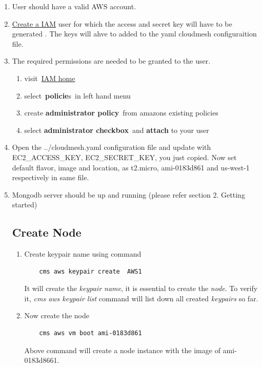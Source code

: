 \documentclass[9pt,twocolumn,twoside]{../../styles/osajnl}
\begin{document}

\begin{enumerate}
	\item User should have a valid AWS account.
	\item \href{https://console.aws.amazon.com/iam/home?#/users}{Create a IAM}  user for which the access and secret key will have to be generated \cite{www-attach-policy}. The keys will ahve to added to the yaml cloudmesh configuraition file.
	
	\item The required permissions are needed to be granted to the user.
		\begin{enumerate}
			
			\item visit \href{https://console.aws.amazon.com/iam/home} {IAM home}
			\item select \textbf{policie}s in left hand menu
			\item create \textbf{administrator policy} from amazons existing policies
			\item select \textbf{administrator checkbox} and \textbf{attach} to your user
		\end{enumerate}
		
	\item Open the ../cloudmesh.yaml configuration file and update with EC2\_ACCESS\_KEY, EC2\_SECRET\_KEY, you just copied. Now set default flavor, image and location, as t2.micro, ami-0183d861 and us-west-1 respectively in same file.
	\item Mongodb server should be up and running (please refer section 2. Getting started)

\subsection{Create Node}

\begin{enumerate}
	\item Create keypair name using command
	
	\begin{verbatim}
	cms aws keypair create  AWS1
	\end{verbatim}
	
	It will create the \textit{keypair name}, it is essential to create the \textit{node}. To verify it, \textit{cms aws keypair list} command will list down all created \textit{keypairs} so far.
	
	\item Now create the node 
	
	\begin{verbatim}
	cms aws vm boot ami-0183d861
	\end{verbatim}
	
	Above command will create a node instance with the image of ami-0183d8661.

\end{enumerate}	
\end{enumerate}	
	
\end{document}
